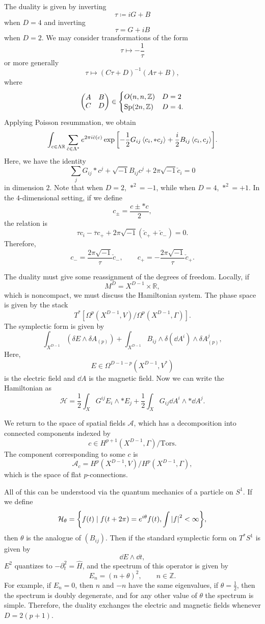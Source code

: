 \documentclass[leqno, openany]{memoir}
\theoremstyle{definition}
\theoremstyle{remark}
\theoremstyle{plain}
\theoremstyle{definition}
\theoremstyle{remark}
\newcommand{\R}{\mathbb{R}}
\newcommand{\Z}{\mathbb{Z}}
\newcommand{\mc}[1]{\mathcal{#1}}
\newcommand{\mr}[1]{\mathrm{#1}}
\newcommand{\on}[1]{\operatorname{#1}}
\newcommand{\ol}[1]{\overline{#1}}
\newcommand{\wh}[1]{\widehat{#1}}
\begin{document}
The duality is given by inverting 
\[ \tau \coloneqq iG + B \]
when $D = 4$ and inverting
\[ \tau = G+iB \]
when $D=2$. We may consider transformations of the form
\[ \tau \mapsto -\frac{1}{\tau} \]
or more generally
\[ \tau \mapsto (C\tau+D)^{-1}(A\tau + B), \]
where
\[ \mqty(A & B \\ C & D) \in \begin{cases}
    O(n,n,\Z) & D=2 \\
    \on{Sp}(2n,\Z) & D=4.
\end{cases} \]
Applying Poisson resummation, we obtain
\[ \int_{c \in \Lambda{\R}} \sum_{\check{c} \in \Lambda^*} e^{2\pi i \check{c}(c)} \exp \qty[-\frac{1}{2} G_{ij} \ev{c_i, *c_j} + \frac{i}{2} B_{ij} \ev{c_i, c_j}]. \]
Here, we have the identity
\[ \sum_j G_{ij} * c^j + \sqrt{-1} B_{ij} c^j + 2 \pi \sqrt{-1} \check{c}_i = 0 \]
in dimension $2$. Note that when $D=2$, $*^2 = -1$, while when $D=4$, $*^2 = +1$. In the $4$-dimensional setting, if we define
\[ c_{\pm} = \frac{c \pm *c}{2}, \]
the relation is
\[ \tau c_i - \ol{\tau} c_+ + 2 \pi \sqrt{-1} (\check{c}_+ + \check{c}_-) = 0. \]
Therefore,
\[ c_- = \frac{2 \pi \sqrt{-1}}{\tau} \check{c}_-, \qquad c_+ = -\frac{2 \pi \sqrt{-1}}{\tau} \check{c}_+. \]

The duality must give some reassignment of the degrees of freedom. Locally, if
\[ M^D = X^{D-1} \times \R, \]
which is noncompact, we must discuss the Hamiltonian system. The phase space is given by the stack
\[ T^* [ \Omega^p(X^{D-1}, V) / \Omega^p(X^{D-1},\Gamma) ]. \]
The symplectic form is given by
\[ \int_{X^{D-1}} (\delta E \wedge \delta A_{(p)}) + \int_{X^{D-1}} B_{ij} \wedge \delta(\dd{A^i}) \wedge \delta A^j_{(p)}, \]
Here,
\[ E \in \Omega^{D-1-p}(X^{D-1}, V^*) \]
is the electric field and $\dd{A}$ is the magnetic field. Now we can write the Hamiltonian as
\[ \mc{H} = \frac{1}{2} \int_X G^{ij} E_i \wedge * E_j + \frac{1}{2} \int_X G_{ij} \dd{A^i} \wedge * \dd{A}^j. \]

We return to the space of spatial fields $\mc{A}$, which has a decomposition into connected components indexed by
\[ c \in H^{p+1}(X^{D-1},\Gamma)/\mr{Tors}. \]
The component corresponding to some $c$ is 
\[ \mc{A}_c = H^p(X^{D-1},V) / H^p(X^{D-1},\Gamma), \]
which is the space of flat $p$-connections.

All of this can be understood via the quantum mechanics of a particle on $S^1$. If we define 
\[ \mc{H}_{\theta} = \qty{f(t) \mid f(t+2\pi) = e^{i\theta} f(t), \int \abs{f}^2 < \infty}, \]
then $\theta$ is the analogue of $(B_{ij})$. Then if the standard symplectic form on $T^* S^1$ is given by
\[ \dd{E} \wedge \dd{t}, \]
$E^2$ quantizes to $-\partial_t^2 = \wh{H}$, and the spectrum of this operator is given by
\[ E_n = (n+\theta)^2, \qquad n \in \Z. \]
For example, if $E_n = 0$, then $n$ and $-n$ have the same eigenvalues, if $\theta = \frac{1}{2}$, then the spectrum is doubly degenerate, and for any other value of $\theta$ the spectrum is simple. Therefore, the duality exchanges the electric and magnetic fields whenever $D = 2(p+1)$.
\end{document}
